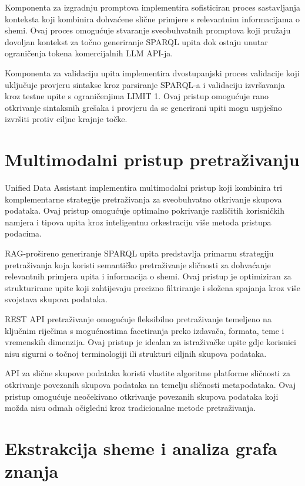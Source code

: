 Komponenta za izgradnju promptova implementira sofisticiran proces sastavljanja konteksta koji kombinira dohvaćene slične primjere s relevantnim informacijama o shemi. Ovaj proces omogućuje stvaranje sveobuhvatnih promptova koji pružaju dovoljan kontekst za točno generiranje SPARQL upita dok ostaju unutar ograničenja tokena komercijalnih LLM API-ja.

Komponenta za validaciju upita implementira dvostupanjski proces validacije koji uključuje provjeru sintakse kroz parsiranje SPARQL-a i validaciju izvršavanja kroz testne upite s ograničenjima LIMIT 1. Ovaj pristup omogućuje rano otkrivanje sintaksnih grešaka i provjeru da se generirani upiti mogu uspješno izvršiti protiv ciljne krajnje točke.

\section{Multimodalni pristup pretraživanju}
\label{sec:multimodal_approach}

Unified Data Assistant implementira multimodalni pristup koji kombinira tri komplementarne strategije pretraživanja za sveobuhvatno otkrivanje skupova podataka. Ovaj pristup omogućuje optimalno pokrivanje različitih korisničkih namjera i tipova upita kroz inteligentnu orkestraciju više metoda pristupa podacima.

RAG-prošireno generiranje SPARQL upita predstavlja primarnu strategiju pretraživanja koja koristi semantičko pretraživanje sličnosti za dohvaćanje relevantnih primjera upita i informacija o shemi. Ovaj pristup je optimiziran za strukturirane upite koji zahtijevaju precizno filtriranje i složena spajanja kroz više svojstava skupova podataka.

REST API pretraživanje omogućuje fleksibilno pretraživanje temeljeno na ključnim riječima s mogućnostima facetiranja preko izdavača, formata, teme i vremenskih dimenzija. Ovaj pristup je idealan za istraživačke upite gdje korisnici nisu sigurni o točnoj terminologiji ili strukturi ciljnih skupova podataka.

API za slične skupove podataka koristi vlastite algoritme platforme sličnosti za otkrivanje povezanih skupova podataka na temelju sličnosti metapodataka. Ovaj pristup omogućuje neočekivano otkrivanje povezanih skupova podataka koji možda nisu odmah očigledni kroz tradicionalne metode pretraživanja.

\section{Ekstrakcija sheme i analiza grafa znanja}
\label{sec:schema_extraction}

